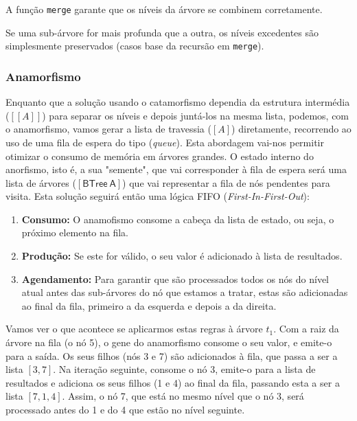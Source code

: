 \documentclass[11pt, a4paper, fleqn]{article}
\begin{document}
\noindent A função \texttt{merge} garante que os níveis da árvore se combinem corretamente.

\noindent Se uma sub-árvore for mais profunda que a outra, os níveis excedentes são simplesmente preservados (casos base da recursão em \texttt{merge}).


\subsubsection*{Anamorfismo}

\noindent Enquanto que a solução usando o catamorfismo dependia da estrutura intermédia ($[[A]]$) para separar os níveis e depois juntá-los na mesma lista, podemos,
com o anamorfismo, vamos gerar a lista de travessia ($[A]$) diretamente, recorrendo ao uso de uma fila de espera do tipo (\textit{queue}).
Esta abordagem vai-nos permitir otimizar o consumo de memória em árvores grandes.
O estado interno do anorfismo, isto é, a sua "semente", que vai corresponder à fila de espera será uma lista de árvores ($\mathsf{[BTree\ A]}$) que vai representar a fila de nós pendentes para visita.
Esta solução seguirá então uma lógica FIFO (\textit{First-In-First-Out}):

\begin{enumerate}
    \item \textbf{Consumo:} O anamofismo consome a cabeça da lista de estado, ou seja, o próximo elemento na fila.
    \item \textbf{Produção:} Se este for válido, o seu valor é adicionado à lista de resultados.
    \item \textbf{Agendamento:} Para garantir que são processados todos os nós do nível atual antes das sub-árvores do nó que estamos a tratar, estas são adicionadas ao final da fila, primeiro a da esquerda e depois a da direita.
\end{enumerate}

\noindent Vamos ver o que acontece se aplicarmos estas regras à árvore $t_1$.
Com a raiz da árvore na fila (o nó 5), o gene do anamorfismo consome o seu valor, e emite-o para a saída. Os seus filhos (nós 3 e 7) são adicionados à fila, que passa a ser a lista $[3, 7]$.
Na iteração seguinte, consome o nó 3, emite-o para a lista de resultados e adiciona os seus filhos (1 e 4) ao final da fila, passando esta a ser a lista $[7, 1, 4]$.
Assim, o nó 7, que está no mesmo nível que o nó 3, será processado antes do 1 e do 4 que estão no nível seguinte.
\end{document}
